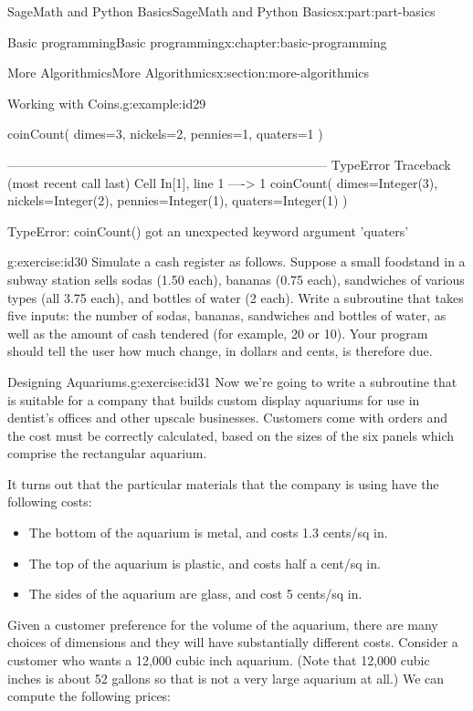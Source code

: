 \documentclass[oneside,10pt,]{book}
\numberwithin{equation}{section}
\begin{document}
\begin{partptx}{SageMath and Python Basics}{}{SageMath and Python Basics}{}{}{x:part:part-basics}
\begin{chapterptx}{Basic programming}{}{Basic programming}{}{}{x:chapter:basic-programming}
\begin{sectionptx}{More Algorithmics}{}{More Algorithmics}{}{}{x:section:more-algorithmics}
\begin{example}{Working with Coins.}{g:example:id29}
\begin{sageinput}
coinCount( dimes=3, nickels=2, pennies=1, quaters=1 )
\end{sageinput}
\begin{sageoutput}
---------------------------------------------------------------------------
TypeError                                 Traceback (most recent call last)
Cell In[1], line 1
----> 1 coinCount( dimes=Integer(3), nickels=Integer(2), pennies=Integer(1), quaters=Integer(1) )

TypeError: coinCount() got an unexpected keyword argument 'quaters'
\end{sageoutput}
\end{example}
\begin{inlineexercise}{}{g:exercise:id30}%
Simulate a cash register as follows. Suppose a small foodstand in a subway station sells sodas (\textdollar{}1.50 each), bananas (\textdollar{}0.75 each), sandwiches of various types (all \textdollar{}3.75 each), and bottles of water (\textdollar{}2 each). Write a subroutine that takes five inputs: the number of sodas, bananas, sandwiches and bottles of water, as well as the amount of cash tendered (for example, \textdollar{}20 or \textdollar{}10). Your program should tell the user how much change, in dollars and cents, is therefore due.\end{inlineexercise}%
\begin{inlineexercise}{Designing Aquariums.}{g:exercise:id31}%
Now we're going to write a subroutine that is suitable for a company that builds custom display aquariums for use in dentist's offices and other upscale businesses. Customers come with orders and the cost must be correctly calculated, based on the sizes of the six panels which comprise the rectangular aquarium.%
\par
It turns out that the particular materials that the company is using have the following costs:%
%
\begin{itemize}[label=\textbullet]
\item{}The bottom of the aquarium is metal, and costs 1.3 cents\slash{}sq in.%
\item{}The top of the aquarium is plastic, and costs half a cent\slash{}sq in.%
\item{}The sides of the aquarium are glass, and cost 5 cents\slash{}sq in.%
\end{itemize}
Given a customer preference for the volume of the aquarium, there are many choices of dimensions and they will have substantially different costs. Consider a customer who wants a 12,000 cubic inch aquarium. (Note that 12,000 cubic inches is about 52 gallons so that is not a very large aquarium at all.) We can compute the following prices:%

\end{inlineexercise}
\end{sectionptx}
\end{chapterptx}
\end{partptx}
\end{document}
